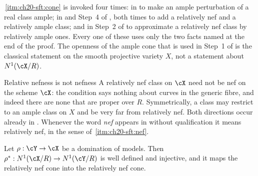 \begin{remark}
\label{rem:ch20-cone-facts}
\,\cref{itm:ch20-sft:cone} is invoked four
times: in  to make an ample perturbation of a real
class ample; in  and Step~4 of
, both times to add a relatively nef
and a relatively ample class; and in Step~2 of
 to approximate a relatively nef class by
relatively ample ones.  Every one of these uses only the two facts named at
the end of the proof.  The openness of the ample cone that is used in
Step~1 of  is the classical
statement on the smooth projective variety \(X\), not a statement about
\(N^1(\cX/R)\).
\end{remark}

\begin{warning}{Relative nefness is not nefness}
A relatively nef class on \(\cX\) need not be nef on the scheme \(\cX\): the
condition says nothing about curves in the generic fibre, and indeed there
are none that are proper over \(R\).  Symmetrically, a class may restrict to
an ample class on \(X\) and be very far from relatively nef.  Both
directions occur already in .  Whenever the
word \emph{nef} appears in 
without qualification it means relatively nef, in the sense of
\,\cref{itm:ch20-sft:nef}.
\end{warning}

\begin{lemma}
\label{lem:ch20-pullback-injective}
Let \(\rho:\cY\to\cX\) be a domination of models.  Then
\(\rho^*:N^1(\cX/R)\to N^1(\cY/R)\) is well defined and injective, and it
maps the relatively nef cone into the relatively nef cone.
\end{lemma}

